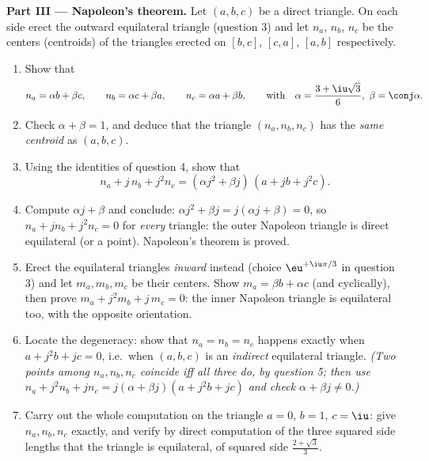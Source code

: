 \begin{problem}
\medskip
\noindent\textbf{Part III --- Napoleon's theorem.} Let $(a, b, c)$
be a direct triangle. On each side erect the outward equilateral
triangle (question 3) and let $n_a$, $n_b$, $n_c$ be the centers
(centroids) of the triangles erected on $[b, c]$, $[c, a]$,
$[a, b]$ respectively.
\begin{enumerate}[resume]
  \item Show that
        \[
        n_a = \alpha b + \beta c, \qquad
        n_b = \alpha c + \beta a, \qquad
        n_c = \alpha a + \beta b,
        \qquad\text{with}\quad
        \alpha = \frac{3 + \iu\sqrt3}{6},\ \beta = \conj\alpha .
        \]
  \item Check $\alpha + \beta = 1$, and deduce that the triangle
        $(n_a, n_b, n_c)$ has the \emph{same centroid} as
        $(a, b, c)$.
  \item Using the identities of question 4, show that
        \[
        n_a + j\,n_b + j^2 n_c
        = (\alpha j^2 + \beta j)\,(a + jb + j^2c) .
        \]
  \item Compute $\alpha j + \beta$ and conclude: $\alpha j^2 +
        \beta j = j(\alpha j + \beta) = 0$, so $n_a + j n_b + j^2
        n_c = 0$ for \emph{every} triangle: the outer Napoleon
        triangle is direct equilateral (or a point). Napoleon's
        theorem is proved.
  \item Erect the equilateral triangles \emph{inward} instead
        (choice $\eu^{+\iu\pi/3}$ in question 3) and let $m_a, m_b,
        m_c$ be their centers. Show $m_a = \beta b + \alpha c$ (and
        cyclically), then prove $m_a + j^2 m_b + j\,m_c = 0$: the
        inner Napoleon triangle is equilateral too, with the
        opposite orientation.
  \item Locate the degeneracy: show that $n_a = n_b = n_c$ happens
        exactly when $a + j^2 b + jc = 0$, i.e.\ when $(a, b, c)$
        is an \emph{indirect} equilateral triangle. \emph{(Two
        points among $n_a, n_b, n_c$ coincide iff all three do, by
        question 5; then use $n_a + j^2 n_b + j n_c = j(\alpha +
        \beta j)(a + j^2b + jc)$ and check $\alpha + \beta j \neq
        0$.)}
  \item Carry out the whole computation on the triangle $a = 0$,
        $b = 1$, $c = \iu$: give $n_a, n_b, n_c$ exactly, and
        verify by direct computation of the three squared side
        lengths that the triangle is equilateral, of squared side
        $\frac{2 + \sqrt3}{3}$.
\end{enumerate}


\end{problem}
